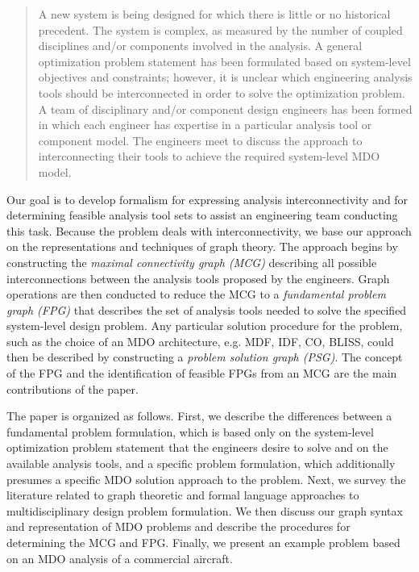     \begin{quote}
    A new system is being designed for which there is little or no historical precedent. The system
    is complex, as measured by the number of coupled disciplines and/or components involved in the
    analysis. A general optimization problem statement has been formulated based on system-level objectives and constraints; however, it is unclear which engineering analysis tools should
    be interconnected in order to solve the optimization problem. A team of disciplinary and/or component design engineers has been formed in which each engineer has expertise in a
    particular analysis tool or component model. The engineers meet to discuss the approach to
    interconnecting their tools to achieve the required system-level MDO model.
    \end{quote}

    Our goal is to develop formalism for expressing analysis interconnectivity and for determining feasible
    analysis tool sets to assist an engineering team conducting this task. Because the problem deals with
    interconnectivity, we base our approach on the representations and techniques of graph theory.
    The approach begins by constructing the \emph{maximal connectivity graph (MCG)} describing all possible
    interconnections between the analysis tools proposed by the engineers. Graph operations are then
    conducted to reduce the MCG to a \emph{fundamental problem graph (FPG)} that describes the set of analysis
    tools needed to solve the specified system-level design problem.
    Any particular solution procedure for the problem, such as the choice of an MDO architecture, e.g. MDF,
    IDF, CO, BLISS, could then be described by
    constructing a \emph{problem solution graph (PSG)}.
    The concept of the FPG and the identification of feasible FPGs from an MCG are the main contributions of the paper.

    The paper is organized as follows. First, we describe the differences between a fundamental problem
    formulation, which is based only on the system-level optimization problem statement that the
    engineers desire to solve and on the available analysis tools, and a specific problem formulation, which
    additionally presumes a specific MDO solution approach to the problem. Next, we survey the literature related to
    graph theoretic and formal language approaches to multidisciplinary design problem formulation. 
    We then discuss our graph syntax and representation of MDO problems and describe the procedures for 
    determining the MCG and FPG. Finally, we present an example problem based on an MDO analysis of a 
    commercial aircraft.


